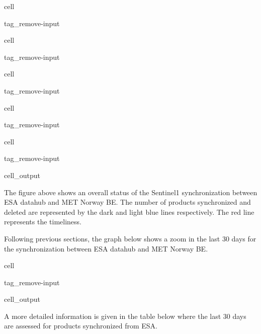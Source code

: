 \documentclass[letterpaper,10pt,english]{jupyterBook}
\begin{document}
\begin{sphinxuseclass}{cell}
\begin{sphinxuseclass}{tag_remove-input}
\end{sphinxuseclass}
\end{sphinxuseclass}
\begin{sphinxuseclass}{cell}
\begin{sphinxuseclass}{tag_remove-input}
\end{sphinxuseclass}
\end{sphinxuseclass}
\begin{sphinxuseclass}{cell}
\begin{sphinxuseclass}{tag_remove-input}
\end{sphinxuseclass}
\end{sphinxuseclass}
\begin{sphinxuseclass}{cell}
\begin{sphinxuseclass}{tag_remove-input}
\end{sphinxuseclass}
\end{sphinxuseclass}
\begin{sphinxuseclass}{cell}
\begin{sphinxuseclass}{tag_remove-input}\begin{sphinxVerbatimOutput}

\begin{sphinxuseclass}{cell_output}
\noindent{}

\end{sphinxuseclass}\end{sphinxVerbatimOutput}

\end{sphinxuseclass}
\end{sphinxuseclass}
\sphinxAtStartPar
The figure above shows an overall status of the Sentinel\sphinxhyphen{}1 synchronization between ESA datahub and MET Norway BE. The number of products synchronized and deleted are represented by the dark and light blue lines respectively. The red line represents the timeliness.

\sphinxAtStartPar
Following previous sections, the graph below shows a zoom in the last 30 days for the synchronization between ESA datahub and MET Norway BE.

\begin{sphinxuseclass}{cell}
\begin{sphinxuseclass}{tag_remove-input}\begin{sphinxVerbatimOutput}

\begin{sphinxuseclass}{cell_output}
\noindent{}

\end{sphinxuseclass}\end{sphinxVerbatimOutput}

\end{sphinxuseclass}
\end{sphinxuseclass}
\sphinxAtStartPar
A more detailed information is given in the table below where the last 30 days are assessed for products synchronized from ESA.
\end{document}
